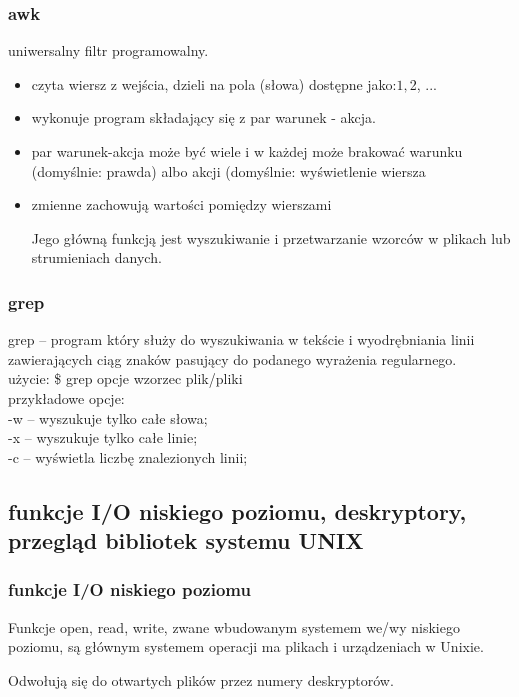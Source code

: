 \documentclass[a4paper,twoside]{report}
\begin{document}
\subsubsection{awk}

uniwersalny filtr programowalny. 
\begin{itemize}
	\item czyta wiersz z wejścia, dzieli na pola (słowa) dostępne jako:$1, $2, ...
	\item wykonuje program składający się z par warunek - akcja.
	\item par warunek-akcja może być wiele i w każdej może brakować warunku
	(domyślnie: prawda) albo akcji (domyślnie: wyświetlenie wiersza
	\item zmienne zachowują wartości pomiędzy wierszami
	
	Jego główną funkcją jest wyszukiwanie i przetwarzanie wzorców w plikach lub strumieniach danych.
\end{itemize} 

\subsubsection{grep}

grep – program który służy do wyszukiwania w tekście i wyodrębniania linii zawierających ciąg znaków pasujący do podanego wyrażenia regularnego.\\

użycie: \$ grep opcje wzorzec plik/pliki\\
przykładowe opcje: \\
-w – wyszukuje tylko całe słowa;\\
-x – wyszukuje tylko całe linie;\\
-c –  wyświetla liczbę znalezionych linii;


\subsection{funkcje I/O niskiego poziomu, deskryptory, przegląd bibliotek systemu UNIX }

\subsubsection{funkcje I/O niskiego poziomu}

Funkcje open, read, write, zwane wbudowanym systemem we/wy niskiego poziomu, są głównym systemem operacji ma plikach i urządzeniach w Unixie.

Odwołują się do otwartych plików przez numery deskryptorów.
\end{document}
